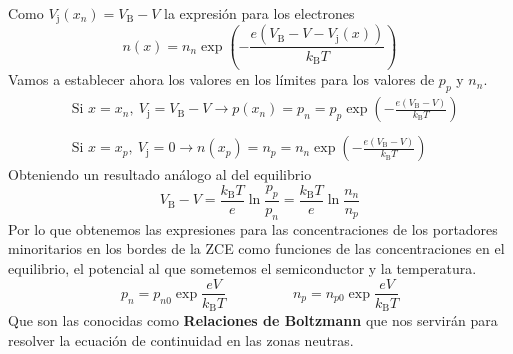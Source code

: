 Como $V_\mathrm{j}(x_n)=V_\mathrm{B}-V$ la expresión para los electrones
\begin{equation}
    n(x)=n_n\exp{\left ( -\frac{e(V_\mathrm{B}-V-V_\mathrm{j}(x))}{k_\mathrm{B}T} \right )}
    \label{eq: Densidad portadores minoritarios n}
\end{equation}
Vamos a establecer ahora los valores en los límites para los valores de $p_p$ y $n_n$. 
\begin{equation}
          \begin{aligned}
         & \text{Si } x=x_n, \ V_\mathrm{j}=V_\mathrm{B}-V \xrightarrow{} p(x_n)=p_n=p_p\exp{\left(-\frac{e(V_\mathrm{B}-V)}{k_\mathrm{B}T} \right)}\\\\ & \text{Si }  x=x_p, \ V_\mathrm{j}=0 \xrightarrow{} n(x_p)=n_p=n_n\exp{\left(-\frac{e(V_\mathrm{B}-V)}{k_\mathrm{B}T} \right)}\end{aligned}  
         \label{eq: expresión de las concentraciones de los minoritarios en los puntos analogos}
\end{equation}
Obteniendo un resultado análogo al del equilibrio
\begin{equation}
    V_\mathrm{B}-V=\frac{k_\mathrm{B}T}{e} \ln \frac{p_p}{p_n}=\frac{k_\mathrm{B}T}{e} \ln \frac{n_n}{n_p}
\end{equation}
\newpage
Por lo que obtenemos las expresiones para las concentraciones de los portadores minoritarios en los bordes de la ZCE como funciones de las concentraciones en el equilibrio, el potencial al que sometemos el semiconductor y la temperatura.
\begin{equation}
    p_n=p_{n0} \exp{\frac{eV}{k_\mathrm{B}T}} \hspace{2cm} n_p=n_{p0} \exp{\frac{eV}{k_\mathrm{B}T}}
    \label{eq: Relaciones de Boltzmann}
\end{equation}
Que son las conocidas como \textbf{Relaciones de Boltzmann} que nos servirán para resolver la ecuación de continuidad en las zonas neutras.
